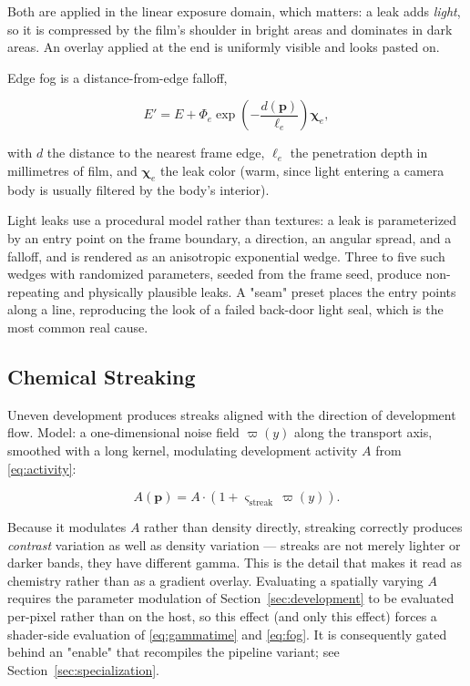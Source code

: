 Both are applied in the linear exposure domain, which matters: a leak adds
\emph{light}, so it is compressed by the film's shoulder in bright areas and
dominates in dark areas. An overlay applied at the end is uniformly visible and
looks pasted on.

Edge fog is a distance-from-edge falloff,

\begin{equation}
E' = E + \Phi_e \exp\!\left(-\frac{d(\mathbf{p})}{\ell_e}\right)\boldsymbol{\chi}_e,
\end{equation}

with $d$ the distance to the nearest frame edge, $\ell_e$ the penetration depth
in millimetres of film, and $\boldsymbol{\chi}_e$ the leak color (warm, since
light entering a camera body is usually filtered by the body's interior).

Light leaks use a procedural model rather than textures: a leak is parameterized
by an entry point on the frame boundary, a direction, an angular spread, and a
falloff, and is rendered as an anisotropic exponential wedge. Three to five such
wedges with randomized parameters, seeded from the frame seed, produce
non-repeating and physically plausible leaks. A "seam" preset places the entry
points along a line, reproducing the look of a failed back-door light seal, which
is the most common real cause.

\subsection{Chemical Streaking}

Uneven development produces streaks aligned with the direction of development
flow. Model: a one-dimensional noise field $\varpi(y)$ along the transport axis,
smoothed with a long kernel, modulating development activity $A$ from
\eqref{eq:activity}:

\begin{equation}
A(\mathbf{p}) = A \cdot \left(1 + \varsigma_{\mathrm{streak}}\, \varpi(y)\right).
\end{equation}

Because it modulates $A$ rather than density directly, streaking correctly
produces \emph{contrast} variation as well as density variation --- streaks are
not merely lighter or darker bands, they have different gamma. This is the
detail that makes it read as chemistry rather than as a gradient overlay.
Evaluating a spatially varying $A$ requires the parameter modulation of
Section~\ref{sec:development} to be evaluated per-pixel rather than on the host,
so this effect (and only this effect) forces a shader-side evaluation of
\eqref{eq:gammatime} and \eqref{eq:fog}. It is consequently gated behind an
"enable" that recompiles the pipeline variant; see
Section~\ref{sec:specialization}.

